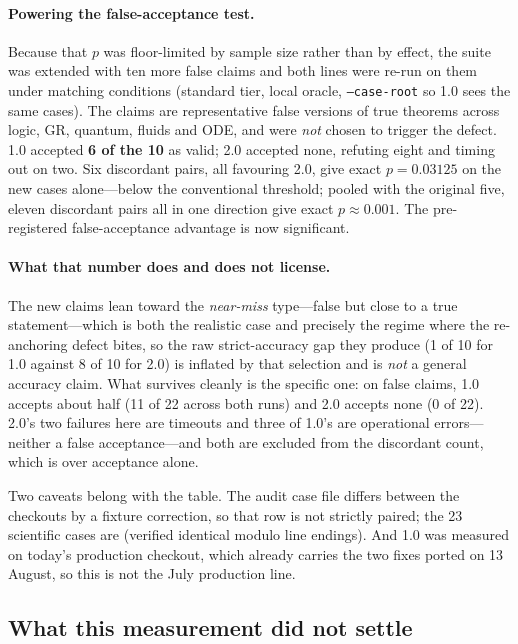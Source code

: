 \documentclass[11pt,a4paper]{article}
\newcommand{\code}[1]{\texttt{\small #1}}
\begin{document}
\paragraph{Powering the false-acceptance test.} Because that $p$ was
floor-limited by sample size rather than by effect, the suite was extended with
ten more false claims and both lines were re-run on them under matching
conditions (standard tier, local oracle, \code{--case-root} so 1.0 sees the same
cases). The claims are representative false versions of true theorems across
logic, GR, quantum, fluids and ODE, and were \emph{not} chosen to trigger the
defect. 1.0 accepted \textbf{6 of the 10} as valid; 2.0 accepted none, refuting
eight and timing out on two. Six discordant pairs, all favouring 2.0, give exact
$p=0.03125$ on the new cases alone---below the conventional threshold; pooled with
the original five, eleven discordant pairs all in one direction give exact
$p\approx0.001$. The pre-registered false-acceptance advantage is now significant.

\paragraph{What that number does and does not license.} The new claims lean
toward the \emph{near-miss} type---false but close to a true statement---which is
both the realistic case and precisely the regime where the re-anchoring defect
bites, so the raw strict-accuracy gap they produce (1 of 10 for 1.0 against 8 of
10 for 2.0) is inflated by that selection and is \emph{not} a general accuracy
claim. What survives cleanly is the specific one: on false claims, 1.0 accepts
about half (11 of 22 across both runs) and 2.0 accepts none (0 of 22). 2.0's two
failures here are timeouts and three of 1.0's are operational errors---neither a
false acceptance---and both are excluded from the discordant count, which is over
acceptance alone.

Two caveats belong with the table. The audit case file differs between the
checkouts by a fixture correction, so that row is not strictly paired; the 23
scientific cases are (verified identical modulo line endings). And 1.0 was
measured on today's production checkout, which already carries the two fixes
ported on 13 August, so this is not the July production line.

\subsection{What this measurement did not settle}
\end{document}
